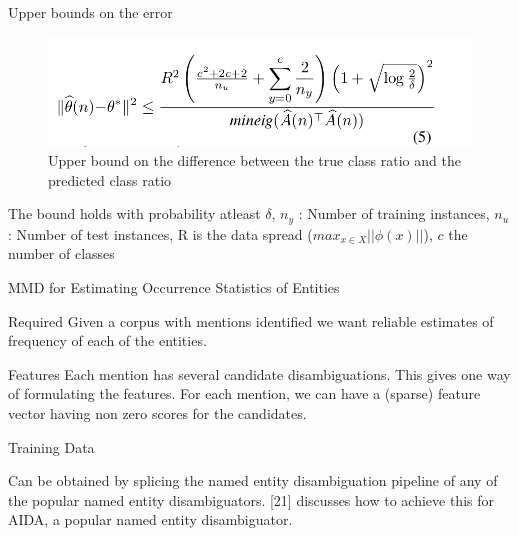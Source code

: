 \begin{frame}{Upper bounds on the error}
\begin{figure}[h]
 \centering
 \includegraphics[bb=0 0 840 218,scale=0.3,keepaspectratio=true]{./bound.png}
 \caption{Upper bound on the difference between the true class ratio and the predicted class ratio}
\end{figure}
The bound holds with probability atleast $\delta$, 
$n_y$ : Number of training instances, $n_u$ : Number of test instances, 
R is the data spread ($max_{x \in X}||\phi(x)||$), $c$ the number of classes


\end{frame}

\begin{frame}{MMD for Estimating Occurrence Statistics of Entities}
 \begin{alertblock}{Required}
 Given a corpus with mentions identified we want reliable estimates of frequency of each
of the entities.
\end{alertblock}
\begin{exampleblock}{Features}
Each mention has several candidate disambiguations. This gives one way of formulating the features. 
For each mention, we can have a (sparse) feature vector having non zero scores for the candidates.
\end{exampleblock}
\begin{exampleblock}{Training Data}

Can be obtained by splicing the named entity disambiguation pipeline of any of the popular
named entity disambiguators. [21] discusses how to achieve this for AIDA, a popular named entity
disambiguator.
\end{exampleblock}

\end{frame}
